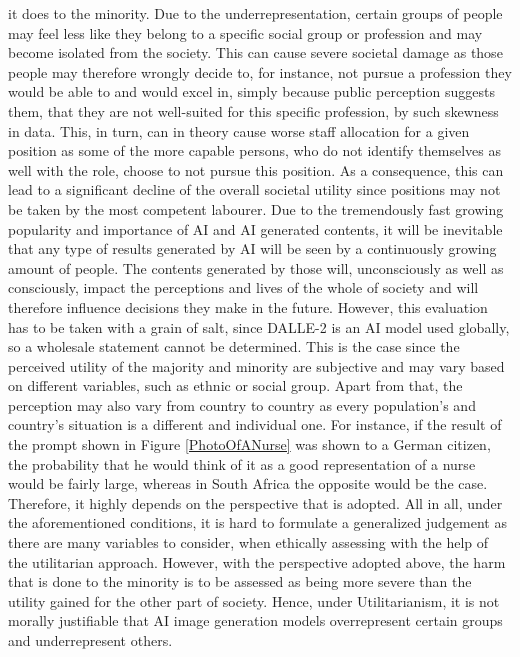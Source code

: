 \documentclass[10pt,twocolumn,twoside]{osajnl}
\begin{document}
it does to the minority. Due to the underrepresentation, certain groups of people may feel less like they belong to a specific social group or profession and may become isolated from the society. This can cause
severe societal damage as those people may therefore wrongly decide to, for instance, not pursue a profession they would be able to and would excel in, simply because public perception suggests them,
that they are not well-suited for this specific profession, by such skewness in data. This, in turn, can in theory cause worse staff allocation for a given position as some of the more capable persons,
who do not identify themselves as well with the role, choose to not pursue this position. As a consequence, this can lead to a significant decline of the overall societal utility since positions 
may not be taken by the most competent labourer. Due to the tremendously fast growing popularity and importance of AI and AI generated contents, it will be inevitable that any type of results generated 
by AI will be seen by a continuously growing amount of people. The contents generated by those will, unconsciously as well as consciously, impact the perceptions and lives of the whole of society and will therefore
influence decisions they make in the future.  
However, this evaluation has to be taken with a grain of salt, since DALLE-2 is an AI model used globally, so a wholesale statement cannot be determined. This is the case 
since the perceived utility of the majority and minority are subjective and may vary based on different variables, such as ethnic or social group. Apart from that,
the perception may also vary from country to country as every population's and country's situation is a different and individual one. 
For instance, if the result of the prompt shown in Figure \ref{PhotoOfANurse} was shown to a German citizen, the probability that he would think of it as a good representation of a nurse would be 
fairly large, whereas in South Africa the opposite would be the case. Therefore, it highly depends on the perspective that is adopted.
All in all, under the aforementioned conditions, it is hard to formulate a generalized judgement as there are many variables to consider, when ethically assessing with the help of the utilitarian approach.
However, with the perspective adopted above, the harm that is done to the minority is to be assessed as being more severe than the utility gained for the other part of society. Hence, under Utilitarianism,
it is not morally justifiable that AI image generation models overrepresent certain groups and underrepresent others.  
\end{document}
